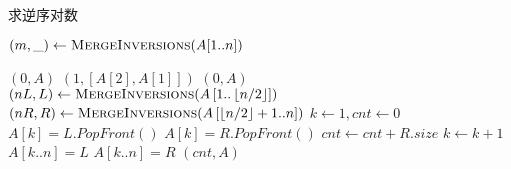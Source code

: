 \begin{questions}
    \begin{algorithm}
        \caption{求逆序对数}
        \begin{algorithmic}[1]

            \State $(m, \_) \gets \Call{MergeInversions}{A[1..n]}$
            \Statex

            \Statex {}
            \State \Return $(0, A)$
            \State \Return $(1, [A[2], A[1]])$
            \Else
            \State \Return $(0, A)$
            \EndIf
            \Else {}
            \State $(nL, L) \gets \Call{MergeInversions}{A\left[1..\left\lfloor n/2 \right\rfloor\right]}$
            \State $(nR, R) \gets \Call{MergeInversions}{A\left[\left\lfloor n/2 \right\rfloor+1 .. n\right]}$
            \State $k \gets 1, cnt \gets 0$ 
            \State $A[k] = L.PopFront()$
            \Else {}
            \State $A[k] = R.PopFront()$
            \State $cnt \gets cnt + R.size$ 
            \EndIf
            \State $k \gets k + 1$
            \EndWhile
             
            \State $A[k..n] = L$
            \State $A[k..n] = R$
            \EndIf
            \State \Return $(cnt, A)$
            \EndIf
            \EndProcedure
        \end{algorithmic}
    \end{algorithm}


\end{questions}
